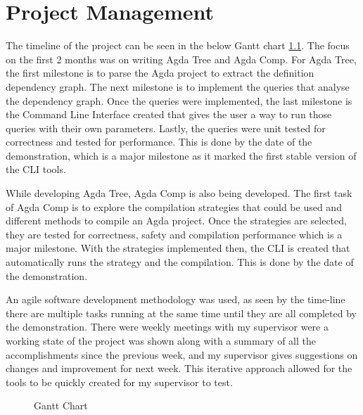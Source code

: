 
\chapter{Project Management}

The timeline of the project can be seen in the below Gantt chart
\cref{fig:Gantt}. The focus on the first 2 months was on writing Agda Tree and
Agda Comp. For Agda Tree, the first milestone is to parse the Agda project to
extract the definition dependency graph. The next milestone is to implement the
queries that analyse the dependency graph. Once the queries were implemented,
the last milestone is the Command Line Interface created that gives the user a
way to run those queries with their own parameters. Lastly, the queries were
unit tested for correctness and tested for performance. This is done by the
date of the demonstration, which is a major milestone as it marked the first
stable version of the CLI tools.

While developing Agda Tree, Agda Comp is also being developed. The first task
of Agda Comp is to explore the compilation strategies that could be used and
different methods to compile an Agda project. Once the strategies are selected,
they are tested for correctness, safety and compilation performance which is a
major milestone. With the strategies implemented then, the CLI is created that
automatically runs the strategy and the compilation. This is done by the date
of the demonstration.

An agile software development methodology was used, as seen by the time-line
there are multiple tasks running at the same time until they are all completed
by the demonstration. There were weekly meetings with my supervisor were a
working state of the project was shown along with a summary of all the
accomplishments since the previous week, and my supervisor gives suggestions on
changes and improvement for next week. This iterative approach allowed for the
tools to be quickly created for my supervisor to test.

\begin{figure}[H]
    \centering
    \label{fig:Gantt}
    \caption{Gantt Chart}
\end{figure} 


